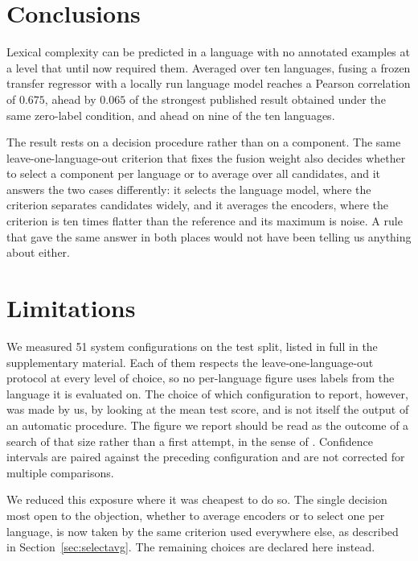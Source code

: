 \section{Conclusions}
\label{sec:conclusions}

Lexical complexity can be predicted in a language with no annotated
examples at a level that until now required them. Averaged over ten
languages, fusing a frozen transfer regressor with a locally run
language model reaches a Pearson correlation of $0.675$, ahead by
$0.065$ of the strongest published result obtained under the same
zero-label condition, and ahead on nine of the ten languages.

The result rests on a decision procedure rather than on a component. The
same leave-one-language-out criterion that fixes the fusion weight also
decides whether to select a component per language or to average over
all candidates, and it answers the two cases differently: it selects the
language model, where the criterion separates candidates widely, and it
averages the encoders, where the criterion is ten times flatter than the
reference and its maximum is noise. A rule that gave the same answer in
both places would not have been telling us anything about either.

\section*{Limitations}

We measured 51 system configurations on the test split, listed in full
in the supplementary material. Each of them respects the
leave-one-language-out protocol at every level of choice, so no
per-language figure uses labels from the language it is evaluated on.
The choice of which configuration to report, however, was made by us,
by looking at the mean test score, and is not itself the output of an
automatic procedure. The figure we report should be read as the outcome
of a search of that size rather than a first attempt, in the sense of
\citet{gorman-bedrick-2019-need}. Confidence intervals are paired
against the preceding configuration and are not corrected for multiple
comparisons.

We reduced this exposure where it was cheapest to do so. The single
decision most open to the objection, whether to average encoders or to
select one per language, is now taken by the same criterion used
everywhere else, as described in Section~\ref{sec:selectavg}. The
remaining choices are declared here instead.

